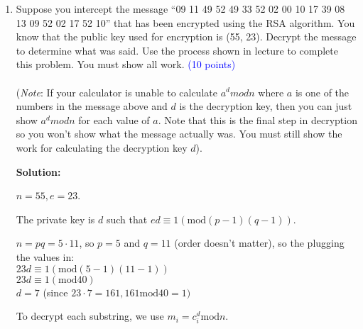 \documentclass{article}
\newcommand{\pt}[1]{\textcolor{blue}{(#1 points)}}
\newenvironment{solution}
{
\par
\color{blue}
\textbf{Solution:}
}
{
\par
}
\begin{document}
\begin{enumerate}
\begin{solution}
Answer: \textbf{``jet fuel"}
\end{solution}

\item Suppose you intercept the message ``09 11 49 52 49 33 52 02 00 10 17 39 08 13 09 52 02 17 52 10” that has been encrypted using the RSA algorithm. You know that the public key used for encryption is (55, 23). Decrypt the message to determine what was said. Use the process shown in lecture to complete this problem. You must show all work. \pt{10}\\\\
(\emph{Note}: If your calculator is unable to calculate $a^dmod n$ where $a$ is one of the numbers in the message above
and $d$ is the decryption key, then you can just show $a^d mod n$ for each value of $a$. Note that this is the final step in decryption so you won’t show what the message actually was. You must still show the work for calculating the
decryption key $d$).

\begin{solution}
$n = 55, e = 23$.

The private key is $d$ such that $ed \equiv 1 (\text{mod} (p - 1)(q - 1))$.

$n = pq = 5 \cdot 11$, so $p = 5$ and $q = 11$ (order doesn't matter), so the plugging the values in:\\
$23d \equiv 1 (\text{mod} (5 - 1)(11 - 1))$\\
$23d \equiv 1 (\text{mod} 40)$\\
$d = 7$ (since $23 \cdot 7 = 161, 161 \text{mod} 40 = 1)$

To decrypt each substring, we use $m_i = c_i^d \text{mod} n$.


\end{solution}
\end{enumerate}
\end{document}
